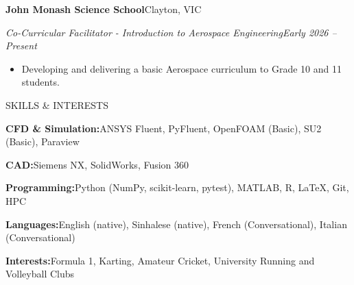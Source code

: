 \documentclass[10pt,a4paper]{article}
\newcommand{\cvsection}[1]{%
  \vspace{7pt}%
  {\large\color{accent}\uppercase{#1}}\par
  \vspace{2pt}{\color{accent}\hrule height 1.1pt}\vspace{3pt}}
\newcommand{\cvorg}[2]{\textbf{#1}\hfill #2\par}
\newcommand{\cvrole}[2]{\textit{#1}\hfill \textit{#2}\par}
\newenvironment{cvitems}{%
  \begin{itemize}[leftmargin=1.6em,labelsep=0.6em,itemsep=1pt,topsep=3pt,parsep=0pt,partopsep=0pt]}%
  {\end{itemize}\vspace{1pt}}
\newcommand{\cvskill}[2]{\textbf{#1}\enspace #2\par\vspace{2.5pt}}
\begin{document}
\cvorg{John Monash Science School}{Clayton, VIC}
\cvrole{Co-Curricular Facilitator - Introduction to Aerospace Engineering}{Early 2026 -- Present}
\begin{cvitems}
  \item Developing and delivering a basic Aerospace curriculum to Grade 10 and 11 students.
\end{cvitems}

\cvsection{Skills \& Interests}
\vspace{2pt}
\cvskill{CFD \& Simulation:}{ANSYS Fluent, PyFluent, OpenFOAM (Basic), SU2 (Basic), Paraview}
\cvskill{CAD:}{Siemens NX, SolidWorks, Fusion 360}
\cvskill{Programming:}{Python (NumPy, scikit-learn, pytest), MATLAB, R, LaTeX, Git, HPC}
\cvskill{Languages:}{English (native), Sinhalese (native), French (Conversational), Italian (Conversational)}
\cvskill{Interests:}{Formula 1, Karting, Amateur Cricket, University Running and Volleyball Clubs}
\end{document}
